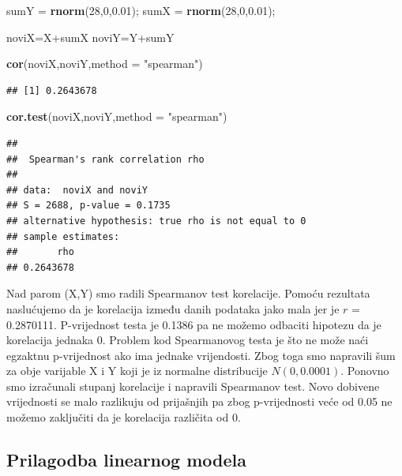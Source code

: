 \documentclass[]{article}
\newenvironment{Shaded}{\begin{snugshade}}{\end{snugshade}}
\newcommand{\KeywordTok}[1]{\textcolor[rgb]{0.13,0.29,0.53}{\textbf{{#1}}}}
\newcommand{\DataTypeTok}[1]{\textcolor[rgb]{0.13,0.29,0.53}{{#1}}}
\newcommand{\DecValTok}[1]{\textcolor[rgb]{0.00,0.00,0.81}{{#1}}}
\newcommand{\FloatTok}[1]{\textcolor[rgb]{0.00,0.00,0.81}{{#1}}}
\newcommand{\StringTok}[1]{\textcolor[rgb]{0.31,0.60,0.02}{{#1}}}
\newcommand{\NormalTok}[1]{{#1}}
\begin{document}
\begin{Shaded}
\begin{Highlighting}[]
\NormalTok{sumY =}\StringTok{ }\KeywordTok{rnorm}\NormalTok{(}\DecValTok{28}\NormalTok{,}\DecValTok{0}\NormalTok{,}\FloatTok{0.01}\NormalTok{);}
\NormalTok{sumX =}\StringTok{ }\KeywordTok{rnorm}\NormalTok{(}\DecValTok{28}\NormalTok{,}\DecValTok{0}\NormalTok{,}\FloatTok{0.01}\NormalTok{);}

\NormalTok{noviX=X+sumX}
\NormalTok{noviY=Y+sumY}

\KeywordTok{cor}\NormalTok{(noviX,noviY,}\DataTypeTok{method =} \StringTok{"spearman"}\NormalTok{)}
\end{Highlighting}
\end{Shaded}

\begin{verbatim}
## [1] 0.2643678
\end{verbatim}

\begin{Shaded}
\begin{Highlighting}[]
\KeywordTok{cor.test}\NormalTok{(noviX,noviY,}\DataTypeTok{method =} \StringTok{"spearman"}\NormalTok{)}
\end{Highlighting}
\end{Shaded}

\begin{verbatim}
## 
##  Spearman's rank correlation rho
## 
## data:  noviX and noviY
## S = 2688, p-value = 0.1735
## alternative hypothesis: true rho is not equal to 0
## sample estimates:
##       rho 
## 0.2643678
\end{verbatim}

Nad parom (X,Y) smo radili Spearmanov test korelacije. Pomoću rezultata
naslućujemo da je korelacija između danih podataka jako mala jer je
\(r\) = 0.2870111. P-vrijednost testa je 0.1386 pa ne možemo odbaciti
hipotezu da je korelacija jednaka 0. Problem kod Spearmanovog testa je
što ne može naći egzaktnu p-vrijednost ako ima jednake vrijendosti. Zbog
toga smo napravili šum za obje varijable X i Y koji je iz normalne
distribucije \(N (0, 0.0001)\). Ponovno smo izračunali stupanj
korelacije i napravili Spearmanov test. Novo dobivene vrijednosti se
malo razlikuju od prijašnjih pa zbog p-vrijednosti veće od 0.05 ne
možemo zaključiti da je korelacija različita od 0.

\subsection{Prilagodba linearnog
modela}\label{prilagodba-linearnog-modela}
\end{document}
